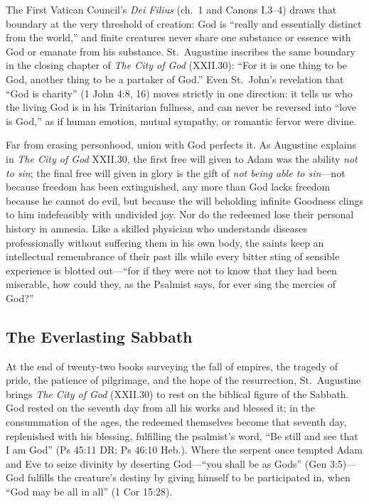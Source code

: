 The First Vatican Council's \emph{Dei Filius} (ch.\ 1 and Canons I.3--4) draws that boundary at the very threshold of creation: God is ``really and essentially distinct from the world,'' and finite creatures never share one substance or essence with God or emanate from his substance. St.\ Augustine inscribes the same boundary in the closing chapter of \emph{The City of God} (XXII.30): ``For it is one thing to be God, another thing to be a partaker of God.'' Even St.\ John's revelation that ``God is charity'' (1 John 4:8, 16) moves strictly in one direction: it tells us who the living God is in his Trinitarian fullness, and can never be reversed into ``love is God,'' as if human emotion, mutual sympathy, or romantic fervor were divine.

Far from erasing personhood, union with God perfects it. As Augustine explains in \emph{The City of God} XXII.30, the first free will given to Adam was the ability \emph{not to sin}; the final free will given in glory is the gift of \emph{not being able to sin}---not because freedom has been extinguished, any more than God lacks freedom because he cannot do evil, but because the will beholding infinite Goodness clings to him indefeasibly with undivided joy. Nor do the redeemed lose their personal history in amnesia. Like a skilled physician who understands diseases professionally without suffering them in his own body, the saints keep an intellectual remembrance of their past ills while every bitter sting of sensible experience is blotted out---``for if they were not to know that they had been miserable, how could they, as the Psalmist says, for ever sing the mercies of God?''

\subsection*{The Everlasting Sabbath}

At the end of twenty-two books surveying the fall of empires, the tragedy of pride, the patience of pilgrimage, and the hope of the resurrection, St.\ Augustine brings \emph{The City of God} (XXII.30) to rest on the biblical figure of the Sabbath. God rested on the seventh day from all his works and blessed it; in the consummation of the ages, the redeemed themselves become that seventh day, replenished with his blessing, fulfilling the psalmist's word, ``Be still and see that I am God'' (Ps 45:11 DR; Ps 46:10 Heb.). Where the serpent once tempted Adam and Eve to seize divinity by deserting God---``you shall be as Gods'' (Gen 3:5)---God fulfills the creature's destiny by giving himself to be participated in, when ``God may be all in all'' (1 Cor 15:28).

